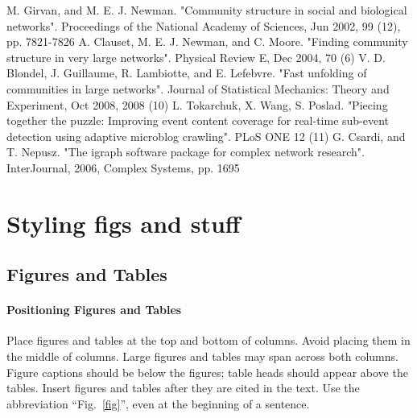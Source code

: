 \documentclass[conference]{IEEEtran}
\begin{document}
\begin{thebibliography}{00}
	 M. Girvan, and M. E. J. Newman. "Community structure in social and biological networks". Proceedings of the National Academy of Sciences, Jun 2002, 99 (12), pp. 7821-7826
	 A. Clauset, M. E. J. Newman, and C. Moore. "Finding community structure in very large networks". Physical Review E, Dec 2004, 70 (6)
	 V. D. Blondel, J. Guillaume, R. Lambiotte, and E. Lefebvre. "Fast unfolding of communities in large networks". Journal of Statistical Mechanics: Theory and Experiment, Oct 2008, 2008 (10)
	 L. Tokarchuk, X. Wang, S. Poslad. "Piecing together the puzzle: Improving event content coverage for real-time sub-event detection using adaptive microblog crawling". PLoS ONE 12 (11)
	 G. Csardi, and T. Nepusz. "The igraph software package for complex network research". InterJournal, 2006, Complex Systems, pp. 1695
\end{thebibliography}


\section{Styling figs and stuff}
\subsection{Figures and Tables}
\paragraph{Positioning Figures and Tables} Place figures and tables at the top and 
bottom of columns. Avoid placing them in the middle of columns. Large 
figures and tables may span across both columns. Figure captions should be 
below the figures; table heads should appear above the tables. Insert 
figures and tables after they are cited in the text. Use the abbreviation 
``Fig.~\ref{fig}'', even at the beginning of a sentence.
\end{document}
